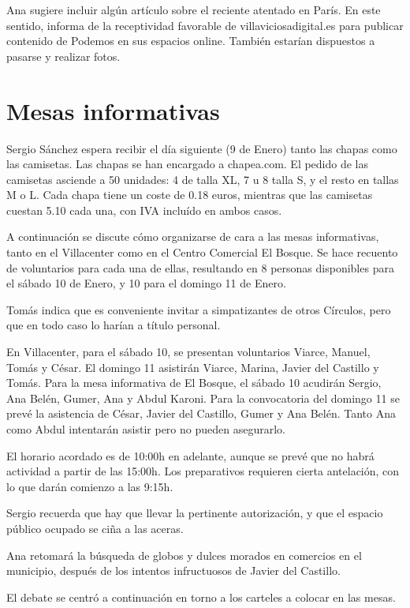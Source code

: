 \documentclass[11pt]{article}
\begin{document}
Ana sugiere incluir algún artículo sobre el reciente atentado en París. En este sentido, informa de la receptividad favorable de villaviciosadigital.es para publicar contenido de Podemos en sus espacios online. También estarían dispuestos a pasarse y realizar fotos.

\section{Mesas informativas}
\label{sec-4}

Sergio Sánchez espera recibir el día siguiente (9 de Enero) tanto las chapas como las camisetas.
Las chapas se han encargado a chapea.com. El pedido de las camisetas asciende a 50 unidades: 4 de talla XL, 7 u 8 talla S, y el resto en tallas M o L.
Cada chapa tiene un coste de 0.18 euros, mientras que las camisetas cuestan 5.10 cada una, con IVA incluído en ambos casos.

A continuación se discute cómo organizarse de cara a las mesas informativas, tanto en el Villacenter como en el Centro Comercial El Bosque.
Se hace recuento de voluntarios para cada una de ellas, resultando en 8 personas disponibles para el sábado 10 de Enero, y 10 para el domingo 11 de Enero.

Tomás indica que es conveniente invitar a simpatizantes de otros Círculos, pero que en todo caso lo harían a título personal.

En Villacenter, para el sábado 10, se presentan voluntarios Viarce, Manuel, Tomás y César. El domingo 11 asistirán Viarce, Marina, Javier del Castillo y Tomás.
Para la mesa informativa de El Bosque, el sábado 10 a\-cu\-di\-rán Sergio, Ana Belén, Gumer, Ana y Abdul Karoni. Para la convocatoria del domingo 11 se prevé la asistencia de César, Javier del Castillo, Gumer y Ana Belén. Tanto Ana como Abdul intentarán asistir pero no pueden asegurarlo.

El horario acordado es de 10:00h en adelante, aunque se prevé que no habrá actividad a partir de las 15:00h. Los preparativos requieren cierta antelación, con lo que darán comienzo a las 9:15h.

Sergio recuerda que hay que llevar la pertinente autorización, y que el espacio público ocupado se ciña a las aceras.

Ana retomará la búsqueda de globos y dulces morados en comercios en el municipio, después de los intentos infructuosos de Javier del Castillo.

El debate se centró a continuación en torno a los carteles a colocar en las mesas.
\end{document}
